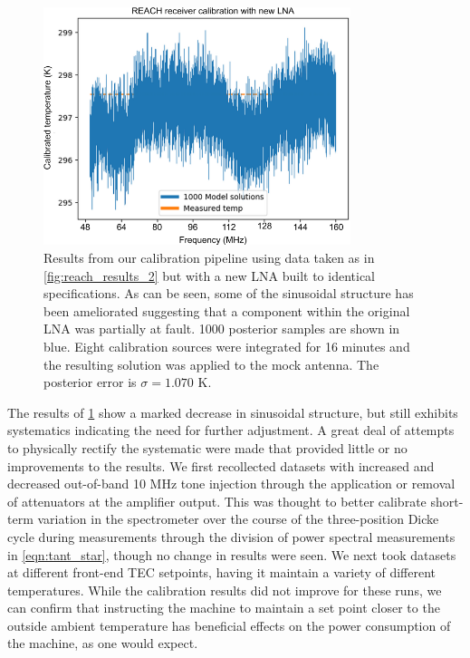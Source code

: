 \begin{figure}
    \centering
    \includegraphics[width=0.8\textwidth]{lna_switched_reach_result}
    \caption{Results from our calibration pipeline using data taken as in \cref{fig:reach_results_2} but with a new LNA built to identical specifications. As can be seen, some of the sinusoidal structure has been ameliorated suggesting that a component within the original LNA was partially at fault. 1000 posterior samples are shown in blue. Eight calibration sources were integrated for 16 minutes and the resulting solution was applied to the mock antenna. The posterior error is $\sigma = 1.070$ K.}
    \label{fig:lna_switched_reach_result}
\end{figure}

The results of \cref{fig:lna_switched_reach_result} show a marked decrease in sinusoidal structure, but still exhibits systematics indicating the need for further adjustment. A great deal of attempts to physically rectify the systematic were made that provided little or no improvements to the results. We first recollected datasets with increased and decreased out-of-band 10 MHz tone injection through the application or removal of attenuators at the amplifier output. This was thought to better calibrate short-term variation in the spectrometer over the course of the three-position Dicke cycle during measurements through the division of power spectral measurements in \cref{eqn:tant_star}, though no change in results were seen. We next took datasets at different front-end TEC setpoints, having it maintain a variety of different temperatures. While the calibration results did not improve for these runs, we can confirm that instructing the machine to maintain a set point closer to the outside ambient temperature has beneficial effects on the power consumption of the machine, as one would expect.

